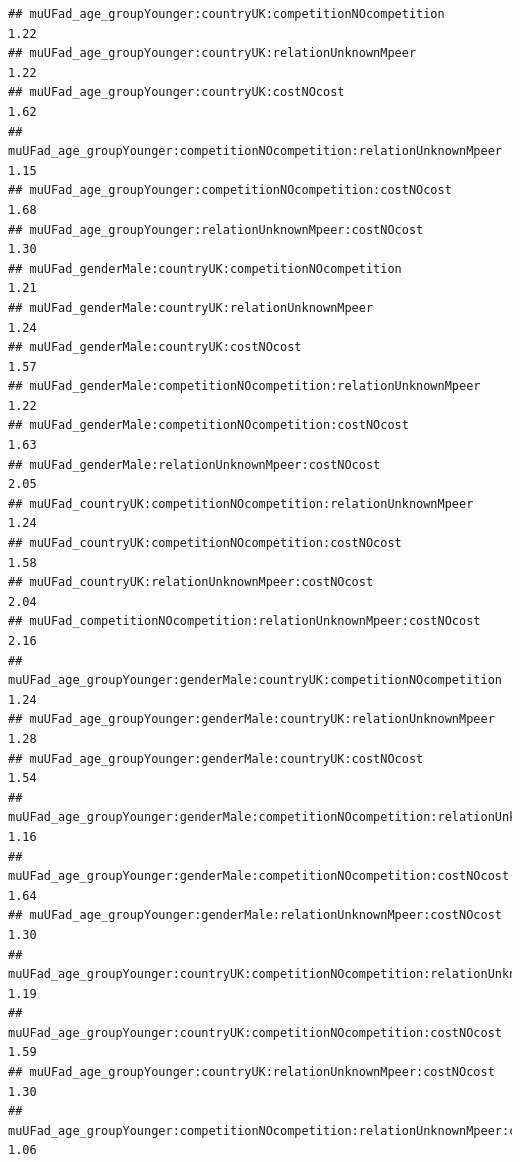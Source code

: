 \documentclass[
]{article}
\begin{document}
\begin{verbatim}
## muUFad_age_groupYounger:countryUK:competitionNOcompetition                                   1.22
## muUFad_age_groupYounger:countryUK:relationUnknownMpeer                                       1.22
## muUFad_age_groupYounger:countryUK:costNOcost                                                 1.62
## muUFad_age_groupYounger:competitionNOcompetition:relationUnknownMpeer                        1.15
## muUFad_age_groupYounger:competitionNOcompetition:costNOcost                                  1.68
## muUFad_age_groupYounger:relationUnknownMpeer:costNOcost                                      1.30
## muUFad_genderMale:countryUK:competitionNOcompetition                                         1.21
## muUFad_genderMale:countryUK:relationUnknownMpeer                                             1.24
## muUFad_genderMale:countryUK:costNOcost                                                       1.57
## muUFad_genderMale:competitionNOcompetition:relationUnknownMpeer                              1.22
## muUFad_genderMale:competitionNOcompetition:costNOcost                                        1.63
## muUFad_genderMale:relationUnknownMpeer:costNOcost                                            2.05
## muUFad_countryUK:competitionNOcompetition:relationUnknownMpeer                               1.24
## muUFad_countryUK:competitionNOcompetition:costNOcost                                         1.58
## muUFad_countryUK:relationUnknownMpeer:costNOcost                                             2.04
## muUFad_competitionNOcompetition:relationUnknownMpeer:costNOcost                              2.16
## muUFad_age_groupYounger:genderMale:countryUK:competitionNOcompetition                        1.24
## muUFad_age_groupYounger:genderMale:countryUK:relationUnknownMpeer                            1.28
## muUFad_age_groupYounger:genderMale:countryUK:costNOcost                                      1.54
## muUFad_age_groupYounger:genderMale:competitionNOcompetition:relationUnknownMpeer             1.16
## muUFad_age_groupYounger:genderMale:competitionNOcompetition:costNOcost                       1.64
## muUFad_age_groupYounger:genderMale:relationUnknownMpeer:costNOcost                           1.30
## muUFad_age_groupYounger:countryUK:competitionNOcompetition:relationUnknownMpeer              1.19
## muUFad_age_groupYounger:countryUK:competitionNOcompetition:costNOcost                        1.59
## muUFad_age_groupYounger:countryUK:relationUnknownMpeer:costNOcost                            1.30
## muUFad_age_groupYounger:competitionNOcompetition:relationUnknownMpeer:costNOcost             1.06

\end{verbatim}
\end{document}
